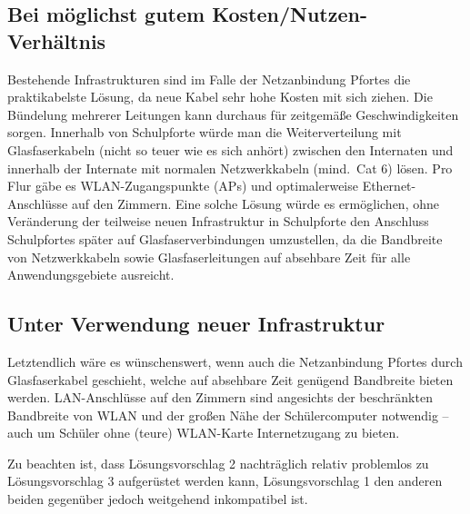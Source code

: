 \documentclass[10pt,a4paper,notitlepage]{scrartcl}
\begin{document}
\subsection{Bei möglichst gutem Kosten/Nutzen-Verhältnis}
\begin{multicols}{2}
Bestehende Infrastrukturen sind im Falle der Netzanbindung Pfortes die praktikabelste Lösung, da neue Kabel sehr hohe Kosten mit sich ziehen. Die Bündelung mehrerer Leitungen kann durchaus für zeitgemäße Geschwindigkeiten sorgen. Innerhalb von Schulpforte würde man die Weiterverteilung mit Glasfaserkabeln (nicht so teuer wie es sich anhört) zwischen den Internaten und innerhalb der Internate mit normalen Netzwerkkabeln (mind.\ Cat 6) lösen. Pro Flur gäbe es WLAN-Zugangspunkte (APs) und optimalerweise Ethernet-Anschlüsse auf den Zimmern. Eine solche Lösung würde es ermöglichen, ohne Veränderung der teilweise neuen Infrastruktur in Schulpforte den Anschluss Schulpfortes später auf Glasfaserverbindungen umzustellen, da die Bandbreite von Netzwerkkabeln sowie Glasfaserleitungen auf absehbare Zeit für alle Anwendungsgebiete ausreicht.
\end{multicols}
\subsection{Unter Verwendung neuer Infrastruktur}
\begin{multicols}{2}
Letztendlich wäre es wünschenswert, wenn auch die Netzanbindung Pfortes durch Glasfaserkabel geschieht, welche auf absehbare Zeit genügend Bandbreite bieten werden. LAN-Anschlüsse auf den Zimmern sind angesichts der beschränkten Bandbreite von WLAN und der großen Nähe der Schülercomputer notwendig -- auch um Schüler ohne (teure) WLAN-Karte Internetzugang zu bieten.

Zu beachten ist, dass Lösungsvorschlag 2 nachträglich relativ problemlos zu Lösungsvorschlag 3 aufgerüstet werden kann, Lösungsvorschlag 1 den anderen beiden gegenüber jedoch weitgehend inkompatibel ist.
\end{multicols}
\end{document}
